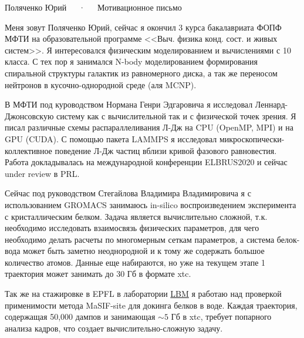 \documentclass[12pt, a4paper]{awesome-cv}
\begin{document}
\makecvheader[C]

\makecvfooter
  {\thepage}
  {Поляченко Юрий~~~·~~~Мотивационное письмо}
  {\thepage}


\begin{cvletter}

Меня зовут Поляченко Юрий, сейчас я окончил 3 курса бакалавриата ФОПФ МФТИ на образовательной программе <<Выч. физика конд. сост. и живых систем>>. Я интересовался физическим  моделированием и вычислениями с 10 класса. С тех пор я занимался N-body моделированием формирования спиральной структуры галактик из равномерного диска, а так же переносом нейтронов в кусочно-однородной среде (аля MCNP). 

В МФТИ под куроводством Нормана Генри Эдгаровича я исследовал Леннард-Джонсовскую систему как с вычислительной так и с физической точек зрения. Я писал различные схемы распараллеливания Л-Дж на CPU (OpenMP, MPI) и на GPU (CUDA). С помощью пакета LAMMPS я исследовал микроскопически-коллективное поведение Л-Дж частиц вблизи кривой фазового равновестия. Работа докладывалась на международной конференции ELBRUS2020 и сейчас under review в PRL. 

Сейчас под руководством Стегайлова Владимира Владимировича я с использованием GROMACS занимаюсь in-silico воспроизведением эксперимента с кристаллическим белком. Задача является вычислительно сложной, т.к. необходимо исследовать взаимосвязь физических параметров, для чего необходимо делать расчеты по многомерным сеткам параметров, а система белок-вода может быть заметно неоднородной и к тому же содержать большое количество атомов. Данные еще набираются, но уже на текущем этапе 1 траектория может занимать до 30 Гб в формате xtc.

Так же на стажировке в EPFL в лаборатории \href{https://www.epfl.ch/labs/lbm/}{LBM} я работаю над проверкой применимости метода MaSIF-site для докинга белков в воде. Каждая траектория, содержащая 50,000 дампов и занимающая $\sim 5$ Гб в xtc, требует попарного анализа кадров, что создает вычислительно-сложную задачу.


\end{cvletter}
\end{document}
